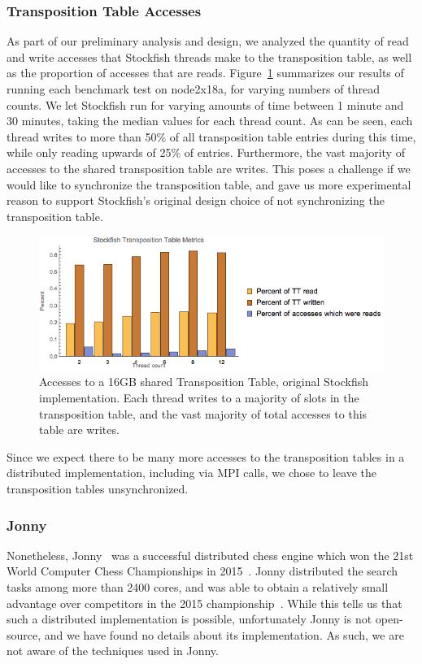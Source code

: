 \documentclass{article}
\begin{document}
\subsubsection{Transposition Table Accesses}
As part of our preliminary analysis and design, we analyzed the quantity of
read and write accesses that Stockfish threads make to the transposition table, as well as
the proportion of accesses that are reads. Figure~\ref{fig:accesses} summarizes
our results of running each benchmark test on node2x18a, for varying numbers of
thread counts. We let Stockfish run for varying amounts of time between 1
minute and 30 minutes, taking the median values for each thread count. As can be
seen, each thread writes to more than 50\% of all transposition table entries during
this time, while only reading upwards of 25\% of entries. Furthermore, the vast
majority of accesses to the shared transposition table are writes. This poses a
challenge if we would like to synchronize the transposition table, and gave us
more experimental reason to support Stockfish's original design choice of not
synchronizing the transposition table.

\begin{figure}
	\includegraphics[width=\textwidth]{../plots/TTmetrics}
	\caption{Accesses to a 16GB shared Transposition Table, original Stockfish
	implementation. Each thread writes to a majority of slots in the
	transposition table, and the vast majority of total accesses to this
	table are writes.}
	\label{fig:accesses}
\end{figure}

Since we expect there to be many more accesses to the transposition tables in a
distributed implementation, including via MPI calls, we chose to leave the
transposition tables unsynchronized.

\subsubsection{Jonny}
Nonetheless, Jonny~\cite{wiki:Jonny} was a successful distributed chess engine
which won the 21st World Computer Chess Championships in 2015~\cite{WCCC15}.
Jonny distributed the search tasks among more than 2400 cores, and was able to
obtain a relatively small advantage over competitors in the 2015
championship~\cite{WCCC15}.
While this tells us that such a distributed implementation is possible,
unfortunately Jonny is not open-source, and we have found no details about its
implementation. As such, we are not aware of the techniques used in Jonny.
\end{document}
